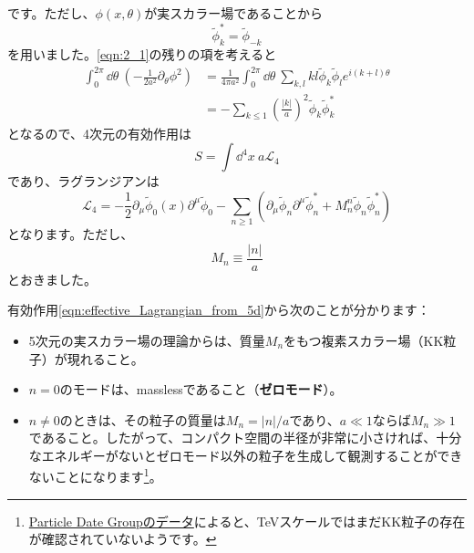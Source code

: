 \documentclass[unicode,a4paper,11pt]{ltjsarticle}
\begin{document}
です。ただし、$\phi(x,\theta)$が実スカラー場であることから
\begin{equation}
   \tilde{\phi}_{k}^{\ast}=\tilde{\phi}_{-k}
\end{equation}
を用いました。\eqref{eqn:2_1}の残りの項を考えると
\begin{align}
   \int_{0}^{2\pi}\dd \theta\
   \left(
   -
   \frac{1}{2a^2}\partial_{\theta}\phi^2
   \right)
    & =
   \frac{1}{4\pi a^2}
   \int_{0}^{2\pi}\dd \theta\
   \sum_{k,l}kl\tilde{\phi}_{k}\tilde{\phi}_{l}e^{i(k+l)\theta}
   \nonumber
   \\
    & =
   -\sum_{k\leq 1}\left( \frac{|k|}{a} \right)^2 \tilde{\phi}_{k}\tilde{\phi}_{k}^{\ast}
\end{align}
となるので、4次元の有効作用は
\begin{equation}
   S
   =
   \int\dd^4 x\ a\mathcal{L}_{4}
\end{equation}
であり、ラグランジアンは
\begin{equation}
   \mathcal{L}_{4}
   =
   -\frac{1}{2}\partial_{\mu}\tilde{\phi}_{0}(x)\partial^{\mu}\tilde{\phi}_{0}
   -\sum_{n\geq 1}
   \left(
   \partial_{\mu}\tilde{\phi}_{n}\partial^{\mu}\tilde{\phi}_{n}^{\ast}
   +
   M_{n}^{n}\tilde{\phi}_{n}\tilde{\phi}_{n}^{\ast}
   \right)
   \label{eqn:effective_Lagrangian_from_5d}
\end{equation}
となります。ただし、
\begin{equation}
   M_{n}
   \equiv
   \frac{|n|}{a}
\end{equation}
とおきました。

有効作用\eqref{eqn:effective_Lagrangian_from_5d}から次のことが分かります：
\begin{itemize}
   \item
         5次元の実スカラー場の理論からは、質量$M_{n}$をもつ複素スカラー場（KK粒子）が現れること。
   \item
         $n=0$のモードは、masslessであること（\textbf{ゼロモード}）。
   \item
         $n\neq 0$のときは、その粒子の質量は$M_{n}=|n|/a$であり、$a\ll 1$ならば$M_{n}\gg 1$であること。したがって、コンパクト空間の半径が非常に小さければ、十分なエネルギーがないとゼロモード以外の粒子を生成して観測することができないことになります\footnote{
            \href{https://pdg.lbl.gov/2023/tables/rpp2023-sum-searches.pdf}{Particle Date Groupのデータ}によると、TeVスケールではまだKK粒子の存在が確認されていないようです。
         }。
\end{itemize}
\end{document}
